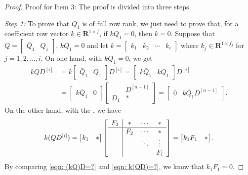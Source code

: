 \documentclass[sort&compress]{elsarticle}
\newcommand\R{\mathbf R}
\begin{document}
{\begin{proof}
Proof for Item 3:
The proof is divided into three steps.

\emph{Step 1:}
To prove that $  Q_1$ is of full row rank,
we just need to prove that, for a
coefficient row vector $k\in\R^{1\times  f}$,
if $k  Q_1=0$, then $k=0$.
Suppose that $Q=\begin{bmatrix}\bar Q_1&Q_1\end{bmatrix}$, $k  Q_1=0$ and
let $k=\begin{bmatrix}k_1&k_2&\cdots&k_i\end{bmatrix}$
where $k_j\in\R^{1\times  f_j}$ for $j=1,2,\dots,i$.
On one hand, with $k  Q_1=0$, we get
\begin{equation}\label{eqn: (kQ)D=?}
\begin{aligned}
kQD^{[i]}
&=k\begin{bmatrix}\bar Q_1&Q_1\end{bmatrix}D^{[i]}
=\begin{bmatrix}k\bar Q_1&kQ_1\end{bmatrix}D^{[i]}\\
&=\begin{bmatrix}k\bar Q_1&0\end{bmatrix}
\begin{bmatrix}&D^{[n-1]}\\ D_1&*\end{bmatrix}
=\begin{bmatrix}0&k\bar Q_1  D^{[n-1]}\end{bmatrix}.
\end{aligned}
\end{equation}
On the other hand, with the , we have
\begin{equation}\label{eqn: k(QD)=?}
k(QD^{[i]})=
\begin{bmatrix}k_1&*\end{bmatrix}
\left[\begin{array}{c|ccc}
F_1&*&\cdots&*\\
\hline
&F_2&\cdots&*\\
&&\ddots&\vdots\\
&&&F_i
\end{array}\right]
=\begin{bmatrix}k_1F_1&*\end{bmatrix}.
\end{equation}
By comparing \eqref{eqn: (kQ)D=?} and \eqref{eqn: k(QD)=?},
we know that $k_1F_1=0$.


\end{proof}}
\end{document}
